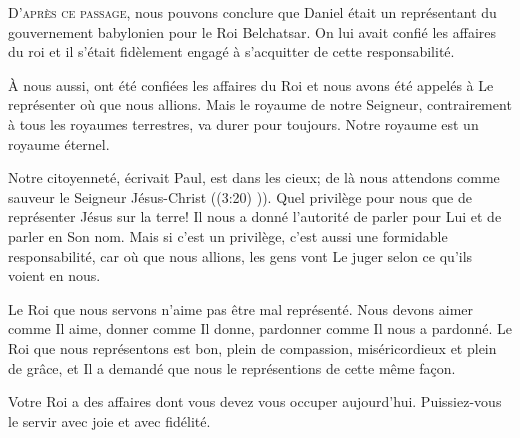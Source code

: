 
\lettrine{D}{'après ce passage,}
 nous pouvons conclure que Daniel était un représentant du gouvernement
 babylonien pour le Roi Belchatsar. On lui avait confié
 les affaires du roi et il s'était fidèlement engagé
 à s'acquitter de cette responsabilité. 

À nous aussi, ont été confiées les affaires du Roi et nous avons été appelés
 à Le représenter où que nous allions. Mais le royaume de notre Seigneur,
 contrairement à tous les royaumes terrestres, 
 va durer pour toujours.  Notre royaume est un royaume éternel. 


\og Notre citoyenneté, écrivait Paul, 
 est dans les cieux; de là nous attendons comme sauveur
 le Seigneur Jésus-Christ \fg{} ((3:20) \NBS)).
 Quel privilège pour nous que de représenter Jésus sur la terre!
 Il nous a donné l'autorité de parler pour Lui et de parler en Son nom.
 Mais si c'est un privilège, c'est aussi une formidable responsabilité,
 car où que nous allions, les gens vont Le juger selon ce qu'ils voient en nous. 

Le Roi que nous servons n'aime pas être mal représenté.
 Nous devons aimer comme Il aime, donner comme Il donne, pardonner
 comme Il nous a pardonné. Le Roi que nous représentons est bon,
 plein de compassion, miséricordieux et plein de grâce,
 et Il a demandé que nous le représentions de cette même façon. 

Votre Roi a des affaires dont vous devez vous occuper aujourd'hui.
 Puissiez-vous le servir avec joie et avec fidélité. 

\dvrule







